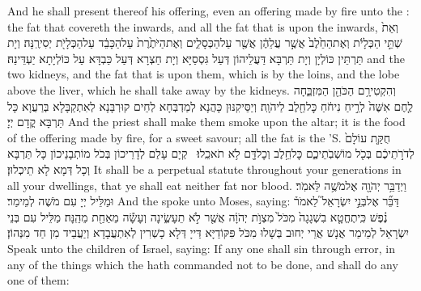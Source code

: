 {And he shall present thereof his offering, even an offering made by fire unto the \lord: the fat that covereth the inwards, and all the fat that is upon the inwards,}{}
{וְאֵת֙ שְׁתֵּ֣י הַכְּלָיֹ֔ת וְאֶת\maqqaf הַחֵ֙לֶב֙ אֲשֶׁ֣ר עֲלֵהֶ֔ן אֲשֶׁ֖ר עַל\maqqaf הַכְּסָלִ֑ים וְאֶת\maqqaf הַיֹּתֶ֙רֶת֙ עַל\maqqaf הַכָּבֵ֔ד עַל\maqqaf הַכְּלָיֹ֖ת יְסִירֶֽנָּה׃}
{וְיָת תַּרְתֵּין כּוֹלְיָן וְיָת תַּרְבָּא דַּעֲלֵיהוֹן דְּעַל גִּסְסַיָּא וְיָת חַצְרָא דְּעַל כַּבְדָּא עַל כּוֹלְיָתָא יַעְדֵּינַהּ׃}
{and the two kidneys, and the fat that is upon them, which is by the loins, and the lobe above the liver, which he shall take away by the kidneys.}{}
{וְהִקְטִירָ֥ם הַכֹּהֵ֖ן הַמִּזְבֵּ֑חָה לֶ֤חֶם אִשֶּׁה֙ לְרֵ֣יחַ נִיחֹ֔חַ כׇּל\maqqaf חֵ֖לֶב לַיהֹוָֽה׃}
{וְיַסֵּיקִנּוּן כָּהֲנָא לְמַדְבְּחָא לְחֵים קוּרְבָּנָא לְאִתְקַבָּלָא בְּרַעֲוָא כָּל תַּרְבָּא קֳדָם יְיָ׃}
{And the priest shall make them smoke upon the altar; it is the food of the offering made by fire, for a sweet savour; all the fat is the \lord’S.}{}
{חֻקַּ֤ת עוֹלָם֙ לְדֹרֹ֣תֵיכֶ֔ם בְּכֹ֖ל מוֹשְׁבֹֽתֵיכֶ֑ם כׇּל\maqqaf חֵ֥לֶב וְכׇל\maqqaf דָּ֖ם לֹ֥א תֹאכֵֽלוּ׃ \petucha }
{קְיָם עָלַם לְדָרֵיכוֹן בְּכֹל מוֹתְבָנֵיכוֹן כָּל תַּרְבָּא וְכָל דְּמָא לָא תֵיכְלוּן׃}
{It shall be a perpetual statute throughout your generations in all your dwellings, that ye shall eat neither fat nor blood.}{}
\newperek
{}
{וַיְדַבֵּ֥ר יְהֹוָ֖ה אֶל\maqqaf מֹשֶׁ֥ה לֵּאמֹֽר׃}
{וּמַלֵּיל יְיָ עִם מֹשֶׁה לְמֵימַר׃}
{And the \lord\space spoke unto Moses, saying:}{}
{דַּבֵּ֞ר אֶל\maqqaf בְּנֵ֣י יִשְׂרָאֵל֮ לֵאמֹר֒ נֶ֗פֶשׁ כִּֽי\maqqaf תֶחֱטָ֤א בִשְׁגָגָה֙ מִכֹּל֙ מִצְוֺ֣ת יְהֹוָ֔ה אֲשֶׁ֖ר לֹ֣א תֵעָשֶׂ֑ינָה וְעָשָׂ֕ה מֵאַחַ֖ת מֵהֵֽנָּה׃}
{מַלֵּיל עִם בְּנֵי יִשְׂרָאֵל לְמֵימַר אֲנָשׁ אֲרֵי יְחוּב בְּשָׁלוּ מִכֹּל פִּקּוֹדַיָּא דַּייָ דְּלָא כָשְׁרִין לְאִתְעֲבָדָא וְיַעֲבֵיד מִן חַד מִנְּהוֹן׃}
{Speak unto the children of Israel, saying: If any one shall sin through error, in any of the things which the \lord\space hath commanded not to be done, and shall do any one of them:}{}
